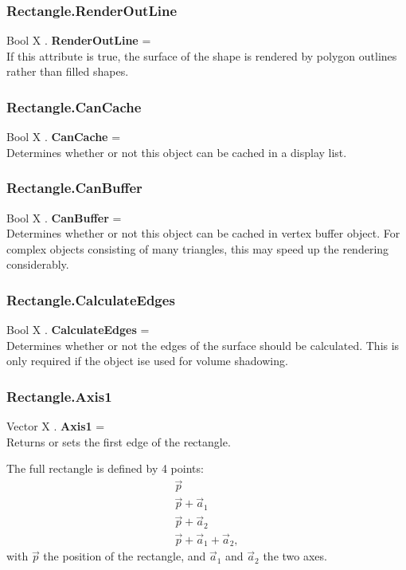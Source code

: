 \subsubsection{Rectangle.RenderOutLine \label{F:Rectangle:RenderOutLine}}
Bool X . \textbf{RenderOutLine} = \\
If this attribute is true, the surface of the shape is rendered by polygon outlines rather than filled shapes.

\subsubsection{Rectangle.CanCache \label{F:Rectangle:CanCache}}
Bool X . \textbf{CanCache} = \\
Determines whether or not this object can be cached in a display list.

\subsubsection{Rectangle.CanBuffer \label{F:Rectangle:CanBuffer}}
Bool X . \textbf{CanBuffer} = \\
Determines whether or not this object can be cached in vertex buffer object. For complex objects consisting of many triangles, this may speed up the rendering considerably.

\subsubsection{Rectangle.CalculateEdges \label{F:Rectangle:CalculateEdges}}
Bool X . \textbf{CalculateEdges} = \\
Determines whether or not the edges of the surface should be calculated. This is only required if the object ise used for volume shadowing.

\subsubsection{Rectangle.Axis1 \label{F:Rectangle:Axis1}}
Vector X . \textbf{Axis1} = \\
Returns or sets the first edge of the rectangle.

The full rectangle is defined by 4 points:
\begin{equation}
\begin{array}{l}
\vec{p} \\
\vec{p} + \vec{a}_1 \\
\vec{p} + \vec{a}_2 \\
\vec{p} + \vec{a}_1 + \vec{a}_2, 
\end{array}
\end{equation}
with $\vec{p}$ the position of the rectangle, and $\vec{a}_1$ and $\vec{a}_2$ the two axes.

